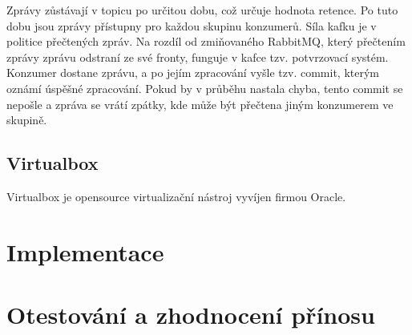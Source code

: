 \documentclass[thesis=M,czech,hidelinks]{FITthesis}[2013/05/06]
\begin{document}
Zprávy zůstávají v topicu po určitou dobu, což určuje hodnota retence. Po tuto dobu jsou zprávy přístupny pro každou skupinu konzumerů. Síla kafku je v politice přečtených zpráv. Na rozdíl od zmiňovaného RabbitMQ, který přečtením zprávy zprávu odstraní ze své fronty, funguje v kafce tzv. potvrzovací systém. Konzumer dostane zprávu, a po jejím zpracování vyšle tzv. commit, kterým oznámí úspěšné zpracování. Pokud by v průběhu nastala chyba, tento commit se nepošle a zpráva se vrátí zpátky, kde může být přečtena jiným konzumerem ve skupině.

\section{Virtualbox}\label{sec:virtualbox}
Virtualbox je opensource virtualizační nástroj vyvíjen firmou Oracle. 






\chapter{Implementace}






\chapter{Otestování a zhodnocení přínosu}


 \setlength{\parskip}{10pt}

\begin{conclusion}

\end{conclusion}
\end{document}
